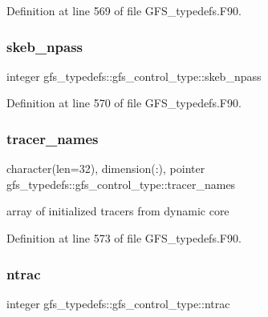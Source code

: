 Definition at line 569 of file G\+F\+S\+\_\+typedefs.\+F90.

\mbox{\label{structgfs__typedefs_1_1gfs__control__type_afde28aaf05f59057ef51bae7263abf59}} 
\subsubsection{skeb\+\_\+npass}
{\footnotesize\ttfamily integer gfs\+\_\+typedefs\+::gfs\+\_\+control\+\_\+type\+::skeb\+\_\+npass}



Definition at line 570 of file G\+F\+S\+\_\+typedefs.\+F90.

\mbox{\label{structgfs__typedefs_1_1gfs__control__type_a4acd5d7cb1d4540f9211a096def7cdc3}} 
\subsubsection{tracer\+\_\+names}
{\footnotesize\ttfamily character(len=32), dimension(\+:), pointer gfs\+\_\+typedefs\+::gfs\+\_\+control\+\_\+type\+::tracer\+\_\+names}



array of initialized tracers from dynamic core 



Definition at line 573 of file G\+F\+S\+\_\+typedefs.\+F90.

\mbox{\label{structgfs__typedefs_1_1gfs__control__type_a80a8626751a29b4ea6d94b60c017c16d}} 
\subsubsection{ntrac}
{\footnotesize\ttfamily integer gfs\+\_\+typedefs\+::gfs\+\_\+control\+\_\+type\+::ntrac}




